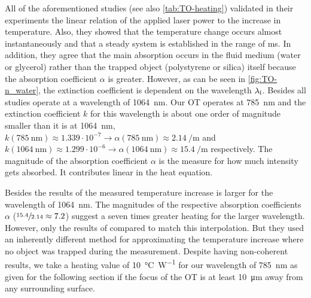 All of the aforementioned studies (see also \cref{tab:TO-heating}) validated in 
their experiments the linear relation of the applied laser power to the 
increase in temperature. Also, they showed that the temperature change occurs 
almost instantaneously and that a steady system is established in the range of 
\si{\ms}. In addition, they agree that the main absorption occurs in the fluid 
medium (water or glycerol) rather than the trapped object (polystyrene or 
silica) itself because the absorption coefficient $\alpha$ is greater. However, 
as can be seen in \cref{fig:TO-n_water}, the extinction coefficient is 
dependent on the wavelength $\lambda_{\mathrm{l}}$. Besides \cite{Moreau2015} all studies 
operate at a wavelength of \SI{1064}{\nm}. Our OT operates at \SI{785}{\nm} and 
the extinction coefficient $k$ for this wavelength is about one order of 
magnitude smaller than it is at \SI{1064}{\nm},
$k(\SI{785}{\nm}) \approx 1.339\cdot 10^{-7} \rightarrow \alpha(\SI{785}{\nm}) 
\approx \SI{2.14}{\per\meter} $ and $k(\SI{1064}{\nm}) \approx 1.299\cdot 
10^{-6} \rightarrow \alpha(\SI{1064}{\nm}) \approx \SI{15.4}{\per\meter} $ 
respectively. The magnitude of the absorption coefficient $\alpha$ is the 
measure for how much intensity gets absorbed. It contributes linear in the heat 
equation.

Besides the results of  the measured temperature increase 
is larger for the wavelength of \SI{1064}{\nm}. The magnitudes of the 
respective absorption coefficients $\alpha$ ($\sfrac{15.4}{2.14}\approx 7.2$) 
suggest a seven times greater heating for the larger wavelength. However, only 
the results of  compared to  match this 
interpolation. But they used an inherently different method for approximating 
the temperature increase where no object was trapped during the measurement. 
Despite having non-coherent results, we take a heating value of 
\SI{10}{\degreeCelsius\per\watt} for our wavelength of \SI{785}{\nm} as given 
for the following section if the focus of the OT is at least \SI{10}{\um} away 
from any surrounding surface.

